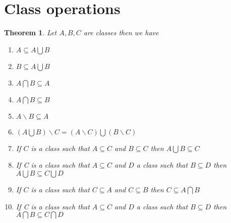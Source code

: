 \documentclass{book}
\newtheorem{theorem}{Theorem}
\begin{document}
\section{Class operations}

\begin{theorem}
  \label{class intersection, union, inclusion}Let $A, B, C$ are classes then
  we have
  \begin{enumerate}
    \item $A \subseteq A \bigcup B$
    
    \item $B \subseteq A \bigcup B$
    
    \item $A \bigcap B \subseteq A$
    
    \item $A \bigcap B \subseteq B$
    
    \item $A\backslash B \subseteq A$
    
    \item $\left( A \bigcup B \right) \backslash C = (A\backslash C) \bigcup
    (B\backslash C)$
    
    \item If $C$ is a class such that $A \subseteq C$ and $B \subseteq C$ then
    $A \bigcup B \subseteq C$
    
    \item If C is a class such that $A \subseteq C$ and $D$ a class such that
    $B \subseteq D$ then $A \bigcup B \subseteq C \bigcup D$
    
    \item If $C$ is a class such that $C \subseteq A$ and $C \subseteq B$ then
    $C \subseteq A \bigcap B$
    
    \item If C is a class such that $A \subseteq C$ and $D$ a class such that
    $B \subseteq D$ then $A \bigcap B \subseteq C \bigcap D$
  \end{enumerate}
\end{theorem}
\end{document}

